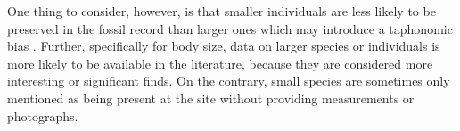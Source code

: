 One thing to consider, however, is that smaller individuals are less likely to be preserved in the fossil record than larger ones which may introduce a taphonomic bias \citep{Lyons2008}. Further, specifically for body size, data on larger species or individuals is more likely to be available in the literature, because they are considered more interesting or significant finds. On the contrary, small species are sometimes only mentioned as being present at the site without providing measurements or photographs.














